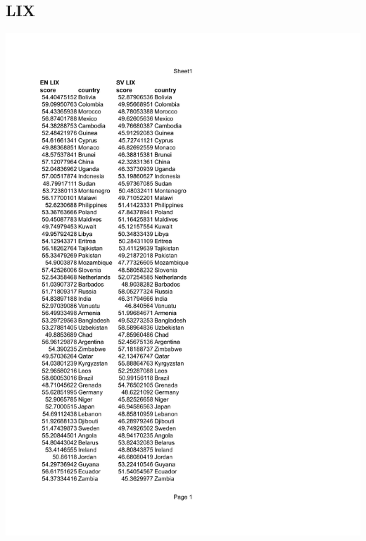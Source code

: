 \documentclass[a4paper]{article}
\begin{document}
\subsection{LIX}
\includegraphics[page=1,scale=0.75]{./DATA/LIX.pdf}
\end{document}
